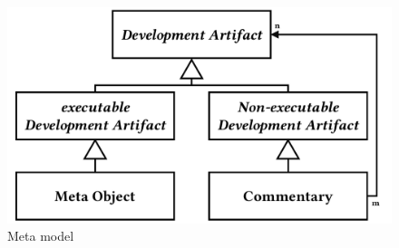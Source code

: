 \begin{figure}
\includegraphics[page=1, width=\columnwidth]{images/metamodel}
\caption{Meta model}
\end{figure}
